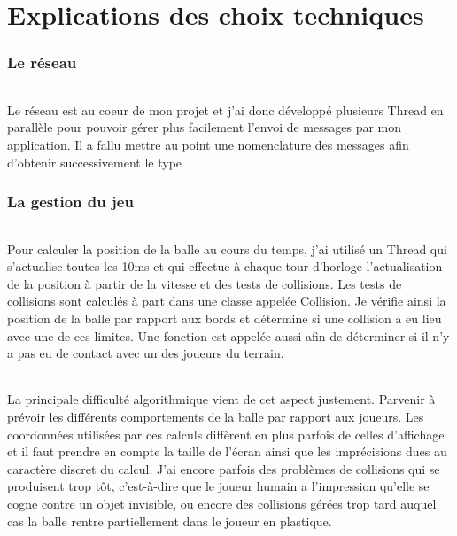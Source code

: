 \documentclass[a4paper,12pt]{report}
\begin{document}
\part{Explications des choix techniques}
\section{Le réseau}
\paragraph{}
Le réseau est au coeur de mon projet et j'ai donc développé plusieurs Thread en parallèle pour pouvoir gérer plus facilement l'envoi de messages par mon application.
Il a fallu mettre au point une nomenclature des messages afin d'obtenir successivement le type 
\section{La gestion du jeu}
\paragraph{}
Pour calculer la position de la balle au cours du temps, j'ai utilisé un Thread qui s'actualise toutes les 10ms et qui effectue à chaque tour d'horloge
l'actualisation de la position à partir de la vitesse et des tests de collisions. Les tests de collisions sont calculés à part dans une classe appelée Collision.
Je vérifie ainsi la position de la balle par rapport aux bords et détermine si une collision a eu lieu avec une de ces limites. Une fonction est appelée aussi afin de
déterminer si il n'y a pas eu de contact avec un des joueurs du terrain.
\paragraph{}
La principale difficulté algorithmique vient de cet aspect justement. Parvenir à prévoir les différents comportements de la balle par rapport aux
joueurs. Les coordonnées utilisées par ces calculs diffèrent en plus parfois de celles d'affichage et il faut prendre en compte la taille de l'écran ainsi que les imprécisions dues au caractère discret du calcul. J'ai encore parfois des problèmes de collisions qui se produisent trop tôt, c'est-à-dire que le joueur humain a l'impression qu'elle se cogne contre un objet invisible, ou encore des collisions gérées trop tard auquel cas la balle rentre partiellement dans le joueur en plastique.
\end{document}

